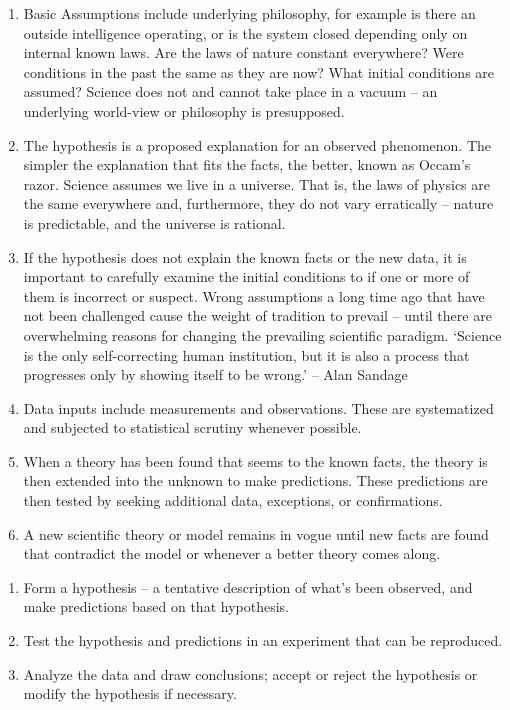 \begin{enumerate}
	\item Basic Assumptions include underlying philosophy, for example is there an outside intelligence operating, or is the system closed depending only on internal known laws. Are the laws of nature constant everywhere?  Were conditions in the past the same as they are now?  What initial conditions are assumed?  Science does not and cannot take place in a vacuum – an underlying world-view or philosophy is presupposed.
	\item The hypothesis is a proposed explanation for an observed phenomenon. The simpler the explanation that fits the facts, the better, known as Occam’s razor. Science assumes we live in a universe. That is, the laws of physics are the same everywhere and, furthermore, they do not vary erratically – nature is predictable, and the universe is rational.
	\item If the hypothesis does not explain the known facts or the new data, it is important to carefully examine the initial conditions to if one or more of them is incorrect or suspect. Wrong assumptions a long time ago that have not been challenged cause the weight of tradition to prevail – until there are overwhelming reasons for changing the prevailing scientific paradigm.
	‘Science is the only self-correcting human institution, but it is also a process that progresses only by showing itself to be wrong.’ – Alan Sandage
	\item Data inputs include measurements and observations. These are systematized and subjected to statistical scrutiny whenever possible.
	\item When a theory has been found that seems to the known facts, the theory is then extended into the unknown to make predictions. These predictions are then tested by seeking additional data, exceptions, or confirmations.
	\item A new scientific theory or model remains in vogue until new facts are found that contradict the model or whenever a better theory comes along.
\end{enumerate}

\begin{enumerate}
	\item Form a hypothesis – a tentative description of what’s been observed, and make predictions based on that hypothesis.
	\item Test the hypothesis and predictions in an experiment that can be reproduced.
	\item Analyze the data and draw conclusions; accept or reject the hypothesis or modify the hypothesis if necessary.
\end{enumerate}

